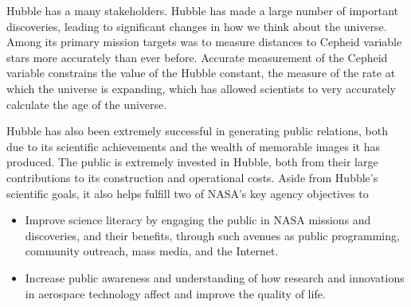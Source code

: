 \documentclass[paper=letter, fontsize=11pt]{scrartcl} %
\numberwithin{equation}{section} %
\numberwithin{figure}{section} %
\numberwithin{table}{section} %
\begin{document}

Hubble has a many stakeholders. Hubble has made a large number of important discoveries, leading to significant changes in how we think about the universe. Among its primary mission targets was to measure distances to Cepheid variable stars more accurately than ever before. Accurate measurement of the Cepheid variable constrains the value of the Hubble constant, the measure of the rate at which the universe is expanding, which has allowed scientists to very accurately calculate the age of the universe.

Hubble has also been extremely successful in generating public relations, both due to its scientific achievements and the wealth of memorable images it has produced. The public is extremely invested in Hubble, both from their large contributions to its construction and operational costs. Aside from Hubble's scientific goals, it also helps fulfill two of NASA's key agency objectives to
\begin{itemize}
\setlength\itemsep{0em}
\item Improve science literacy by engaging the public in NASA missions and discoveries, and their benefits, through such avenues as public programming, community outreach, mass media, and the Internet.
\item Increase public awareness and understanding of how research and innovations in aerospace technology affect and improve the quality of life.
\end{itemize}
\end{document}
